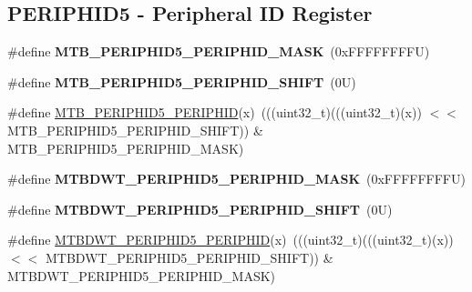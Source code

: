 \subsection*{P\+E\+R\+I\+P\+H\+I\+D5 -\/ Peripheral ID Register}
\begin{DoxyCompactItemize}
\item 
\mbox{\label{group___m_t_b___register___masks_ga97403028b18e8808c0c9b389ae067324}} 
\#define {\bfseries M\+T\+B\+\_\+\+P\+E\+R\+I\+P\+H\+I\+D5\+\_\+\+P\+E\+R\+I\+P\+H\+I\+D\+\_\+\+M\+A\+SK}~(0x\+F\+F\+F\+F\+F\+F\+F\+F\+U)
\item 
\mbox{\label{group___m_t_b___register___masks_ga16968bf6e9c9254ab08df1d84374ddd8}} 
\#define {\bfseries M\+T\+B\+\_\+\+P\+E\+R\+I\+P\+H\+I\+D5\+\_\+\+P\+E\+R\+I\+P\+H\+I\+D\+\_\+\+S\+H\+I\+FT}~(0\+U)
\item 
\#define \mbox{\hyperlink{group___m_t_b___register___masks_ga5178d0f69b007e83f902e4880f428a8e}{M\+T\+B\+\_\+\+P\+E\+R\+I\+P\+H\+I\+D5\+\_\+\+P\+E\+R\+I\+P\+H\+ID}}(x)~(((uint32\+\_\+t)(((uint32\+\_\+t)(x)) $<$$<$ M\+T\+B\+\_\+\+P\+E\+R\+I\+P\+H\+I\+D5\+\_\+\+P\+E\+R\+I\+P\+H\+I\+D\+\_\+\+S\+H\+I\+FT)) \& M\+T\+B\+\_\+\+P\+E\+R\+I\+P\+H\+I\+D5\+\_\+\+P\+E\+R\+I\+P\+H\+I\+D\+\_\+\+M\+A\+SK)
\item 
\mbox{\label{group___m_t_b___register___masks_ga762d50a2531fdd0962d4736b7e783948}} 
\#define {\bfseries M\+T\+B\+D\+W\+T\+\_\+\+P\+E\+R\+I\+P\+H\+I\+D5\+\_\+\+P\+E\+R\+I\+P\+H\+I\+D\+\_\+\+M\+A\+SK}~(0x\+F\+F\+F\+F\+F\+F\+F\+F\+U)
\item 
\mbox{\label{group___m_t_b___register___masks_ga2e250362846de59fcb486266647ec7e8}} 
\#define {\bfseries M\+T\+B\+D\+W\+T\+\_\+\+P\+E\+R\+I\+P\+H\+I\+D5\+\_\+\+P\+E\+R\+I\+P\+H\+I\+D\+\_\+\+S\+H\+I\+FT}~(0\+U)
\item 
\#define \mbox{\hyperlink{group___m_t_b___register___masks_ga48edb015bd6c166b7195ec0e02d8cb7d}{M\+T\+B\+D\+W\+T\+\_\+\+P\+E\+R\+I\+P\+H\+I\+D5\+\_\+\+P\+E\+R\+I\+P\+H\+ID}}(x)~(((uint32\+\_\+t)(((uint32\+\_\+t)(x)) $<$$<$ M\+T\+B\+D\+W\+T\+\_\+\+P\+E\+R\+I\+P\+H\+I\+D5\+\_\+\+P\+E\+R\+I\+P\+H\+I\+D\+\_\+\+S\+H\+I\+FT)) \& M\+T\+B\+D\+W\+T\+\_\+\+P\+E\+R\+I\+P\+H\+I\+D5\+\_\+\+P\+E\+R\+I\+P\+H\+I\+D\+\_\+\+M\+A\+SK)
\item 

\end{DoxyCompactItemize}
